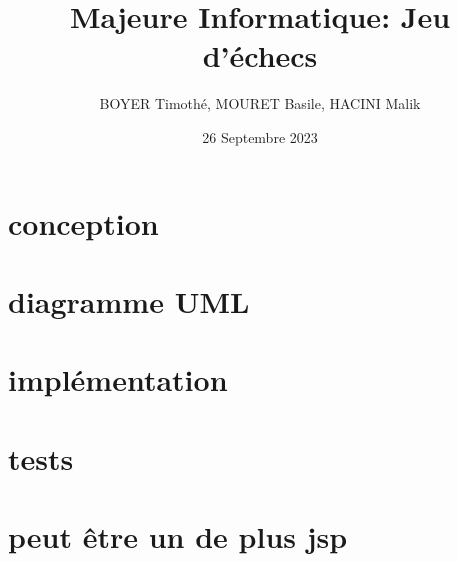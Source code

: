 \documentclass{article}
\title{\centering Majeure Informatique: 
Jeu d'échecs}
\author{BOYER Timothé, MOURET Basile, HACINI Malik}
\date{26 Septembre 2023}
\begin{document}
    
    

\maketitle
\tableofcontents{}


\section{conception}
\section{diagramme UML}
\section{implémentation}
\section{tests}
\section{peut être un de plus jsp}
\end{document}
